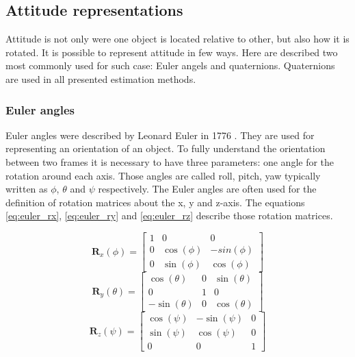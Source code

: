 \documentclass[12pt,a4paper,oneside]{article}
\begin{document}
\subsection{Attitude representations}
Attitude is not only were one object is located relative to other, but also how it is rotated. It is possible to represent attitude in few ways. Here are described two most commonly used for such case: Euler angels and quaternions. Quaternions are used in all presented estimation methods.

\subsubsection{Euler angles}

Euler angles were described by Leonard Euler in 1776 \cite{euler1775formulae}. They are used for representing an orientation of an object.
To fully understand the orientation between two frames it is necessary to have three parameters: one angle for the rotation around each axis. Those angles are called roll, pitch, yaw typically written as $\phi$, $\theta$ and $\psi$ respectively. The Euler angles are often used for the definition of rotation matrices about the x, y and z-axis. The equations \ref{eq:euler_rx}, \ref{eq:euler_ry} and \ref{eq:euler_rz} describe those rotation matrices.

\begin{equation} \label{eq:euler_rx}
\bm{R}_x(\phi) = \begin{bmatrix}
1 & 0 & 0 \\
0 & \cos(\phi) & -sin(\phi) \\
0 & \sin(\phi) & \cos(\phi)
\end{bmatrix}
\end{equation}
\begin{equation} \label{eq:euler_ry}
\bm{R}_y(\theta) = \begin{bmatrix}
\cos(\theta) & 0 & \sin(\theta) \\
0 & 1 & 0 \\
-\sin(\theta) & 0 & \cos(\theta)
\end{bmatrix}
\end{equation}
\begin{equation} \label{eq:euler_rz}
\bm{R}_z(\psi) = \begin{bmatrix}
\cos(\psi) & -\sin(\psi) & 0 \\
\sin(\psi) & \cos(\psi) & 0 \\
0 & 0 & 1
\end{bmatrix}
\end{equation}
\end{document}

